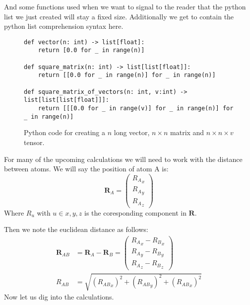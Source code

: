And some functions used when we want to signal to the reader that the python list we just created will stay a fixed size. Additionally we get to contain the python list comprehension syntax here. 

\begin{figure}[H]
\begin{verbatim}
def vector(n: int) -> list[float]:
    return [0.0 for _ in range(n)]

def square_matrix(n: int) -> list[list[float]]:
    return [[0.0 for _ in range(n)] for _ in range(n)]

def square_matrix_of_vectors(n: int, v:int) -> list[list[list[float]]]:
    return [[[0.0 for _ in range(v)] for _ in range(n)] for _ in range(n)]
\end{verbatim}
    \caption{Python code for creating a $n$ long vector, $n\times n$ matrix and $n\times n \times v$ tensor.}
\end{figure}

For many of the upcoming calculations we will need to work with the distance between atoms. We will say the position of atom A is:
\begin{equation}
\pmb{R}_A=
    \begin{pmatrix}
    {R_A}_x\\
    {R_A}_y\\{R_A}_z
    \end{pmatrix}
\end{equation}
Where $R_u$ with $u\in x,y,z$ is the coresponding component in $\pmb{R}$.

Then we note the euclidean distance as follows:
\begin{align}
    \pmb{R}_{AB} &= \pmb{R}_A-\pmb{R}_B=
    \begin{pmatrix}
    {R_A}_x-{R_B}_x\\
    {R_A}_y-{R_B}_y\\
    {R_A}_z-{R_B}_z
    \end{pmatrix}
\\
    R_{AB} &= \sqrt{({R_{AB}}_x)^2+({R_{AB}}_y)^2+({R_{AB}}_x)^2}
\end{align}
Now let us dig into the calculations. 
